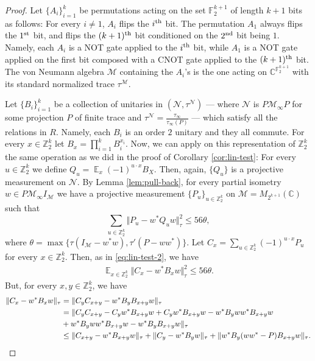 \documentclass[11pt]{article}
\theoremstyle{definition}
\newcommand{\Id}{\ensuremath{I}}
\DeclareMathOperator*{\Expectation}{\mathbb{E}}
\newcommand{\field}{\mathbb{F}_2}
\newcommand{\complex}{\ensuremath{\mathbb{C}}}
\newcommand{\Z}{\ensuremath{\mathbb{Z}}}
\newcommand{\mM}{\ensuremath{\mathcal{M}}}
\newcommand{\cM}{\ensuremath{\mathcal{M}}}
\newcommand{\mN}{\mathcal{N}}
\begin{document}
\begin{proof}
Let $\{A_i\}_{i=1}^k$ be permutations acting on the set $\field^{k+1}$ of length $k+1$ bits as follows: For every $i\neq 1$, $A_i$ flips the $i^{\rm th}$ bit. The permutation $A_1$ always flips the $1^{\rm st}$ bit, and  flips the $(k+1)^{\rm th}$ bit conditioned on the $2^{\rm nd}$ bit being $1$. Namely, each $A_i$ is a NOT gate applied to  the $i^{\rm th}$ bit, while $A_1$ is a NOT gate applied on the first bit composed with a CNOT gate applied to the $(k+1)^{\rm th}$ bit. The von Neumann algebra $\mM$ containing the $A_i$'s is the one acting on $\complex^{\field^{k+1}}$ with its standard normalized trace $\tau^\cM$.

Let $\{B_i\}_{i=1}^k$ be a collection of unitaries in $(\mN,\tau^\mN)$ --- where $\mN$ is $P\mM_\infty P$  for some projection $P$ of finite trace and $\tau^\mN=\frac{\tau_\infty}{\tau_\infty(P)}$ --- which satisfy all the relations in $R$. Namely, each $B_i$ is an order $2$ unitary and they all commute. For every $x\in \Z_2^k$ let  $B_x=\prod_{i=1}^kB_i^{x_i}$. Now, we can apply on this representation of $\Z_2^k$ the same operation as we did in the proof of Corollary \ref{cor:lin-test}: For every $u\in \Z_2^k$ we define $Q_u=\Expectation_x(-1)^{u\cdot x}B_X$. Then, again, $\{Q_u\}$ is a projective measurement on $\mN$. By Lemma \ref{lem:pull-back}, for every partial isometry $w\in P\mM_\infty \Id_\mM$ we have a projective measurement $\{P_u\}_{u\in \Z_2^k}$  on $\mM=M_{2^{k+1}}(\complex)$ such that 
\[
\sum_{u\in \Z_2^k}\Vert P_u -w^*Q_uw\Vert_\tau^2\leq 56\theta,
\]
where $\theta=\max\{\tau(\Id_\mM-w^*w),\tau'(P-ww^*)\}$.
Let $C_x=\sum_{u\in \Z_2^k}(-1)^{u\cdot x}P_u$ for every $x\in \Z_2^k$. Then, as in \eqref{eq:lin-test-2}, we have
\[
\begin{split}
 \Expectation_{x\in \Z_2^k}\Vert C_x-w^*B_xw\Vert_\tau^2\leq 56\theta.
\end{split}
\]
But, for every $x,y\in \Z_2^k$, we have
\begin{align}
      \Vert C_x-w^*B_xw\Vert_\tau&=\Vert C_yC_{x+y}-w^*B_yB_{x+y}w\Vert_\tau \notag\\
    &=\Vert C_yC_{x+y}-C_yw^*B_{x+y}w+C_yw^*B_{x+y}w-w^*B_yww^*B_{x+y}w \notag\\ &+w^*B_yww^*B_{x+y}w-w^*B_yB_{x+y}w\Vert_\tau\notag \\
    &\leq \Vert C_{x+y}-w^*B_{x+y}w\Vert_\tau+\Vert C_y-w^*B_yw\Vert_\tau+\Vert w^*B_y(ww^*-P)B_{x+y}w\Vert_{\tau}.\label{eq:lower_bound_stab_standard_pres}
\end{align}

\end{proof}
\end{document}
